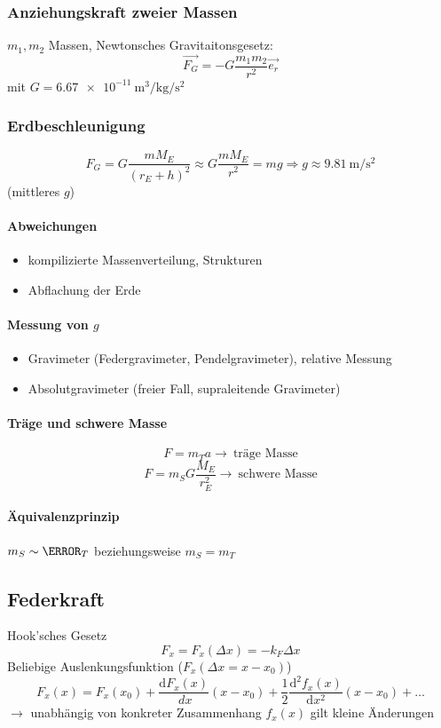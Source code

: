 \documentclass[a4paper]{scrartcl}
\renewcommand{\d}{\mathrm{d}}
\renewcommand{\v}[1]{\vec{#1}}
\newcommand{\dd}[2]{\frac{\d #1}{\ d#2}}
\begin{document}
\subsubsection{Anziehungskraft zweier Massen}
\label{sec-8-1-1}
$m_1,m_2$ Massen, Newtonsches Gravitaitonsgesetz:
\[\v{F_G} = -G\frac{m_1 m_2}{r^2}\v{e_r}\]
mit $G=\SI{6.67e-11}{\meter\cubed\per\kilo\gram\per\second\squared}$
\subsubsection{Erdbeschleunigung}
\label{sec-8-1-2}
\[F_G = G\frac{m M_E}{(r_E + h)^2} \approx G\frac{m M_E}{r^2} = m g \Rightarrow g\approx \SI{9.81}{\meter\per\second\squared}\]
(mittleres $g$) \\
\paragraph{Abweichungen}
\label{sec-8-1-2-1}
\begin{itemize}
\item kompilizierte Massenverteilung, Strukturen
\item Abflachung der Erde
\end{itemize}
\paragraph{Messung von $g$}
\label{sec-8-1-2-2}
\begin{itemize}
\item Gravimeter (Federgravimeter, Pendelgravimeter), relative Messung
\item Absolutgravimeter (freier Fall, supraleitende Gravimeter)
\end{itemize}
\paragraph{Träge und schwere Masse}
\label{sec-8-1-2-3}
\[F= m_T a \rightarrow ~\text{träge Masse}\]
\[F= m_S G\frac{M_E}{r_E^2} \rightarrow ~\text{schwere Masse}\]
\paragraph{Äquivalenzprinzip}
\label{sec-8-1-2-4}
$m_S \sim \m_T$ beziehungsweise $m_S = m_T$
\subsection{Federkraft}
\label{sec-8-2}
Hook'sches Gesetz
\[F_x = F_x(\Delta x) = -k_F \Delta x\]
Beliebige Auslenkungsfunktion ($F_x(\Delta x = x - x_0)$)
\[F_x(x) = F_x(x_0) + \dd{F_x(x)}{x}(x-x_0) + \frac{1}{2}\frac{\d^2 f_x(x)}{\d x^2}(x - x_0) + \ldots\]
$\rightarrow$ unabhängig von konkreter Zusammenhang $f_x(x)$ gilt kleine Änderungen
\end{document}
